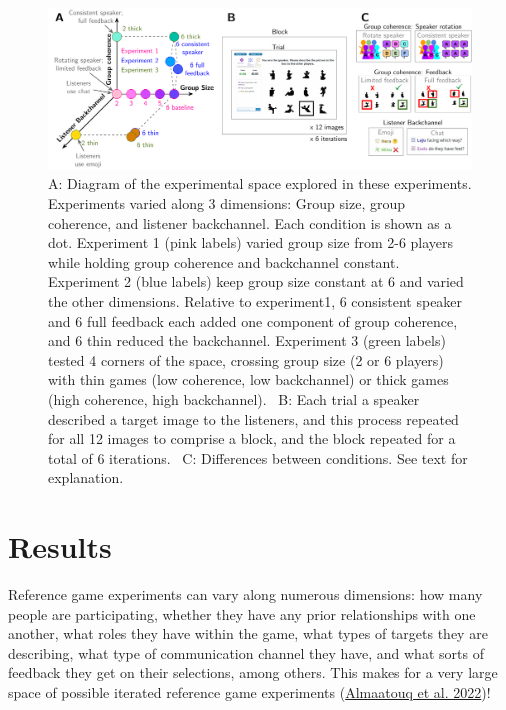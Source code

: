 \documentclass[
  english,
  a4paper,
]{article}
\begin{document}
\begin{figure}[t!]

{\centering \includegraphics[width=1\linewidth]{expt-diagram2} 

}

\caption{A: Diagram of the experimental space explored in these experiments. Experiments varied along 3 dimensions: Group size, group coherence, and listener backchannel. Each condition is shown as a dot. Experiment 1 (pink labels) varied group size from 2-6 players while holding group coherence and backchannel constant. Experiment 2 (blue labels) keep group size constant at 6 and varied the other dimensions. Relative to experiment1, 6 consistent speaker and 6 full feedback each added one component of group coherence, and 6 thin reduced the backchannel. Experiment 3 (green labels) tested 4 corners of the space, crossing group size (2 or 6 players) with thin games (low coherence, low backchannel) or thick games (high coherence, high backchannel). \  B: Each trial a speaker described a target image to the listeners, and this process repeated for all 12 images to comprise a block, and the block repeated for a total of 6 iterations. \ C: Differences between conditions. See text for explanation.}\label{fig:diagram}
\end{figure}

\hypertarget{results}{%
\section{Results}\label{results}}

Reference game experiments can vary along numerous dimensions: how many people are participating, whether they have any prior relationships with one another, what roles they have within the game, what types of targets they are describing, what type of communication channel they have, and what sorts of feedback they get on their selections, among others. This makes for a very large space of possible iterated reference game experiments (\protect\hyperlink{ref-almaatouq2022}{Almaatouq et al. 2022})!
\end{document}
